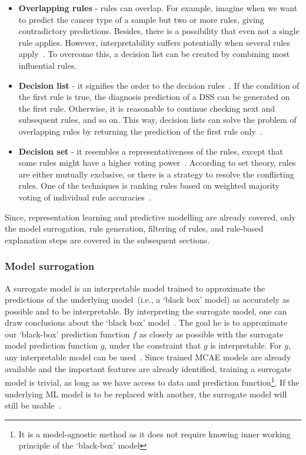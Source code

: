 \begin{itemize}[noitemsep]
    \item \textbf{Overlapping rules} - rules can overlap. For example, imagine when we want to predict the cancer type of a sample but two or more rules, giving contradictory predictions. Besides, there is a possibility that even not a single rule applies. However, interpretability suffers potentially when several rules apply~\cite{molnar2019interpretable}. To overcome this, a decision list can be created by combining most influential rules. 
    \item \textbf{Decision list} - it signifies the order to the decision rules~\cite{molnar2019interpretable}. If the condition of the first rule is true, the diagnosis prediction of a DSS can be generated on the first rule. Otherwise, it is reasonable to continue checking next and subsequent rules, and so on. This way, decision lists can solve the problem of overlapping rules by returning the prediction of the first rule only~\cite{molnar2019interpretable}. 
    \item \textbf{Decision set} - it resembles a representativeness of the rules, except that some rules might have a higher voting power~\cite{molnar2019interpretable}.  According to set theory, rules are either mutually exclusive, or there is a strategy to resolve the conflicting rules. One of the techniques is ranking rules based on weighted majority voting of individual rule accuracies~\cite{molnar2019interpretable}. 
\end{itemize}

\hspace*{3.5mm} Since, representation learning and predictive modelling are already covered, only the model surrogation, rule generation, filtering of rules, and rule-based explanation steps are covered in the subsequent sections. 

\subsubsection{Model surrogation}
A surrogate model is an interpretable model trained to approximate the predictions of the underlying model~(i.e., a `black box' model) as accurately as possible and to be interpretable. By interpreting the surrogate model, one can draw conclusions about the `black box' model~\cite{molnar2019interpretable}. The goal he is to approximate our `black-box' prediction function $f$ as closely as possible with the surrogate model prediction function $g$, under the constraint that $g$ is interpretable. For $g$, any interpretable model can be used~\cite{molnar2019interpretable}. Since trained MCAE models are already available and the important features are already identified, training a surrogate model is trivial, as long as we have access to data and prediction function\footnote{It is a model-agnostic method as it does not require knowing inner working principle of the `black-box' model}. If the underlying ML model is to be replaced with another, the surrogate model will still be usable~\cite{molnar2019interpretable}. 

